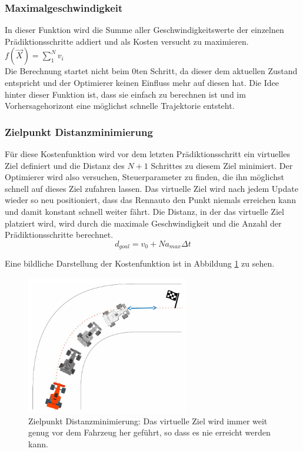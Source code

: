 \documentclass{like}
\begin{document}
\subsubsection*{Maximalgeschwindigkeit}  
In dieser Funktion wird die Summe aller Geschwindigkeitswerte der einzelnen Prädiktionsschritte addiert und als Kosten versucht zu maximieren. \\
$f(\vec{X}) =  \sum_{1}^{N} v_i$ \\
Die Berechnung startet nicht beim $0$ten Schritt, da dieser dem aktuellen Zustand entspricht und der Optimierer keinen Einfluss mehr auf diesen hat. Die Idee hinter dieser Funktion ist, dass sie einfach zu berechnen ist und im Vorhersagehorizont eine möglichst schnelle Trajektorie entsteht.

\subsubsection*{Zielpunkt Distanzminimierung}
Für diese Kostenfunktion wird vor dem letzten Prädiktionsschritt ein virtuelles Ziel definiert und die Distanz des $N+1$ Schrittes zu diesem Ziel minimiert. Der Optimierer wird also versuchen, Steuerparameter zu finden, die ihn möglichst schnell auf dieses Ziel zufahren lassen. Das virtuelle Ziel wird nach jedem Update wieder so neu positioniert, dass das Rennauto den Punkt niemals erreichen kann und damit konstant schnell weiter fährt. Die Distanz, in der das virtuelle Ziel platziert wird, wird durch die maximale Geschwindigkeit und die Anzahl der Prädiktionsschritte berechnet. 
\begin{equation}
	d_{goal} = v_0 + N  a_{max}  \Delta t
\end{equation}


Eine bildliche Darstellung der Kostenfunktion ist in Abbildung \ref{fig:costGoalDist} zu sehen. 

\begin{figure}[ht!]
	\centering
	\includegraphics[width=200pt]{Abbildungen/cost_goal_dist.png}
	\caption{Zielpunkt Distanzminimierung: Das virtuelle Ziel wird immer weit genug vor dem Fahrzeug her geführt, so dass es nie erreicht werden kann.}
	\label{fig:costGoalDist}
\end{figure}
\end{document}
